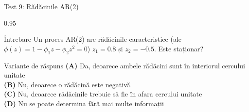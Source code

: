 \documentclass[9pt, aspectratio=169, t]{beamer}
\begin{document}
\begin{frame}{Test 9: Rădăcinile AR(2)}
    \begin{cminipage}{0.95\textwidth}
    \begin{alertblock}{Întrebare}
        Un proces AR(2) are rădăcinile caracteristice (ale $\phi(z) = 1 - \phi_1 z - \phi_2 z^2 = 0$) $z_1 = 0.8$ și $z_2 = -0.5$. Este staționar?
    \end{alertblock}

    \vspace{0.5cm}
    \begin{block}{Variante de răspuns}
    \textcolor{MainBlue}{\textbf{(A)}} Da, deoarece ambele rădăcini sunt în interiorul cercului unitate\\[3pt]
    \textcolor{MainBlue}{\textbf{(B)}} Nu, deoarece o rădăcină este negativă\\[3pt]
    \textcolor{MainBlue}{\textbf{(C)}} Nu, deoarece rădăcinile trebuie să fie în afara cercului unitate\\[3pt]
    \textcolor{MainBlue}{\textbf{(D)}} Nu se poate determina fără mai multe informații
    \end{block}
    \end{cminipage}
\end{frame}
\end{document}
